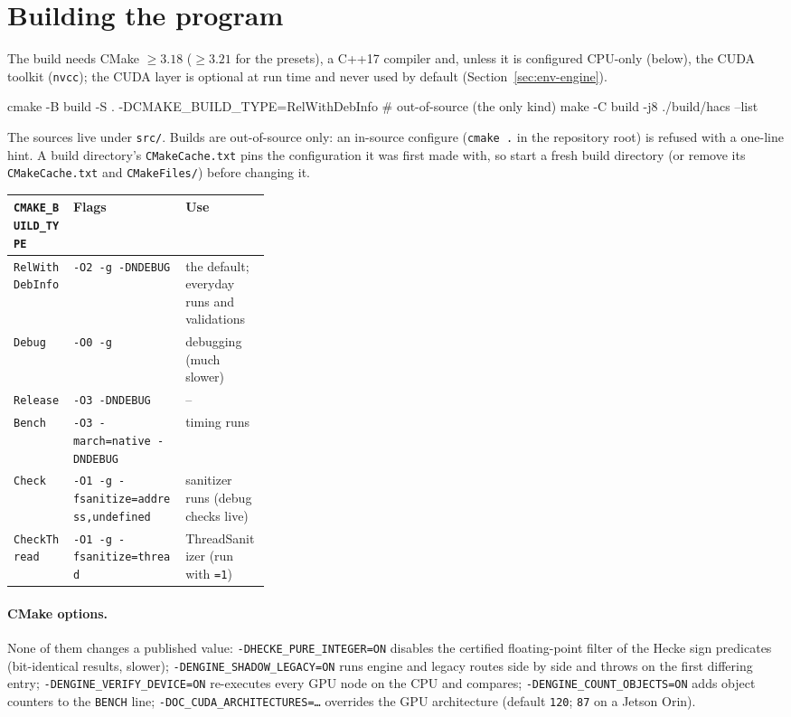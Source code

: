 \documentclass[11pt,openany]{report}
\makeatletter
\newcommand{\cli}[1]{\texttt{#1}}
\DeclareRobustCommand{\envname}[1]{\texttt{\detokenize{#1}}}
\newcommand{\env}[1]{\envname{#1}\index{#1@\envname{#1} (environment)}}
\newcommand{\file}[1]{\nolinkurl{#1}}
\makeatother
\begin{document}
\section{Building the program}\label{sec:build}

The build needs CMake $\ge 3.18$ ($\ge 3.21$ for the presets), a C++17 compiler and, unless it is configured
CPU-only (below), the CUDA toolkit (\texttt{nvcc}); the CUDA layer is optional at run time and never used by
default (Section~\ref{sec:env-engine}).

\begin{shell}
cmake -B build -S . -DCMAKE_BUILD_TYPE=RelWithDebInfo   # out-of-source (the only kind)
make -C build -j8
./build/hacs --list
\end{shell}

The sources live under \file{src/}. Builds are out-of-source only: an in-source configure (\verb|cmake .| in the
repository root) is refused with a one-line hint. A build directory's \file{CMakeCache.txt} pins the configuration it
was first made with, so start a fresh build directory (or remove its \file{CMakeCache.txt} and \file{CMakeFiles/})
before changing it.

\begin{center}\small
\begin{tabular}{@{}ll>{\raggedright\arraybackslash}p{0.33\linewidth}@{}}
\toprule
\textbf{\texttt{CMAKE\_BUILD\_TYPE}} & \textbf{Flags} & \textbf{Use}\\\midrule
\texttt{RelWithDebInfo} & \verb|-O2 -g -DNDEBUG| & the default; everyday runs and validations\\
\texttt{Debug} & \verb|-O0 -g| & debugging (much slower)\\
\texttt{Release} & \verb|-O3 -DNDEBUG| & --\\
\texttt{Bench} & \verb|-O3 -march=native -DNDEBUG| & timing runs\\
\texttt{Check} & \verb|-O1 -g -fsanitize=address,undefined| & sanitizer runs (debug checks live)\\
\texttt{CheckThread} & \verb|-O1 -g -fsanitize=thread| & ThreadSanitizer (run with \env{ENGINE_CUDA_DISABLE}\texttt{=1})\\
\bottomrule
\end{tabular}
\end{center}

\paragraph{CMake options.} None of them changes a published value:
\cli{-DHECKE\_PURE\_INTEGER=ON} disables the certified floating-point filter of the Hecke sign
predicates (bit-identical results, slower); \cli{-DENGINE\_SHADOW\_LEGACY=ON} runs engine and legacy
routes side by side and throws on the first differing entry; \cli{-DENGINE\_VERIFY\_DEVICE=ON}
re-executes every GPU node on the CPU and compares; \cli{-DENGINE\_COUNT\_OBJECTS=ON} adds object
counters to the \texttt{BENCH} line; \cli{-DOC\_CUDA\_ARCHITECTURES=\dots} overrides the GPU
architecture (default \texttt{120}; \texttt{87} on a Jetson Orin).
\end{document}

